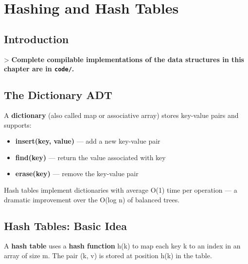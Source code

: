 \chapter{Hashing and Hash Tables}\label{ch08:hashing-and-hash-tables}

\section{Introduction}

> \textbf{Complete compilable implementations of the data structures in this chapter are in \texttt{code/}.}

\section{The Dictionary ADT}

A \textbf{dictionary} (also called map or associative array) stores key-value pairs and supports:

\begin{itemize}
\item \textbf{insert(key, value)} — add a new key-value pair
\item \textbf{find(key)} — return the value associated with key
\item \textbf{erase(key)} — remove the key-value pair
\end{itemize}

Hash tables implement dictionaries with average O(1) time per operation — a dramatic improvement over the O(log n) of balanced trees.

\section{Hash Tables: Basic Idea}

A \textbf{hash table} uses a \textbf{hash function} h(k) to map each key k to an index in an array of size m. The pair (k, v) is stored at position h(k) in the table.

